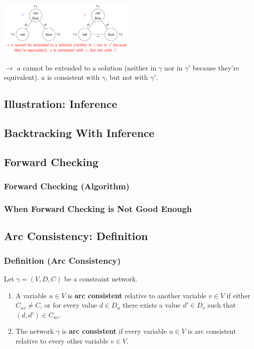 \documentclass[conference, a4paper]{styles/acmsiggraph}
\begin{document}
            \includegraphics[width=0.5\textwidth]{imgs/Inference.png}\newline
            
            $\rightarrow$ $a$ cannot be extended to a solution (neither in $\gamma$ nor in $\gamma'$ because they're equivalent).
            $a$ is consistent with $\gamma$, but not with $\gamma'$.
    
    \subsection{Illustration: Inference}
    \subsection{Backtracking With Inference}
    \subsection{Forward Checking}
        \subsubsection{Forward Checking (Algorithm)}
        \subsubsection{When Forward Checking is Not Good Enough}
    
    
    
    
    
    
    
    \subsection{Arc Consistency: Definition}
        \subsubsection{Definition (Arc Consistency)}
            Let $\gamma = (V,D,C)$ be a constraint network.
            \begin{enumerate}
                \item A variable $u \in V$ is \textbf{arc consistent} relative to another variable $v \in V$ if either $C_{uv} \neq C$, or for every value $d \in D_u$ there exists a value $d' \in D_v$ such that $(d,d') \in C_{uv}$.
                \item The network $\gamma$ is \textbf{arc consistent} if every variable $u \in V$ is arc consistent relative to every other variable $v \in V$.
            \end{enumerate}
            
\end{document}
